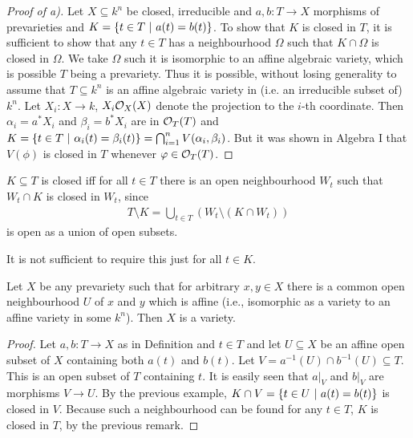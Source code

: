 \documentclass[a4paper,parskip=full,numbers=enddot]{scrreprt}
\begin{document}
\begin{defi}
\begin{example}
\begin{alphanumerate}
    \end{alphanumerate}
\end{example}
\begin{proof}[Proof of a)]
    Let $X\subseteq k^n$ be closed, irreducible and $a,b: T\to X$ morphisms of prevarieties and $K= \left\{t\in T\ \middle|\  a(t) = b(t)\right\}$. To show that $K$ is closed in $T$, it is sufficient to show that any $t\in T$ has a neighbourhood $\Omega$ such that $K\cap \Omega$ is closed in $\Omega$. We take $\Omega$ such it is isomorphic to an affine algebraic variety, which is possible $T$ being a prevariety. Thus it is possible, without losing generality to assume that $T\subseteq k^n$ is an affine algebraic variety in (i.e.  an irreducible subset of) $k^n$. Let $X_i: X\to k$, $X_i\mathcal{O}_X(X)$ denote the projection to the $i$-th coordinate. Then $\alpha_i = a^\ast X_i$ and $\beta_i = b^\ast X_i$ are in $\mathcal{O}_T(T)$ and $K= \left\{ t\in T\ \middle|\  \alpha_i(t) = \beta_i(t)\right\} = \bigcap_{i=1}^n V(\alpha_i, \beta_i)$. But it was shown in Algebra I that $V(\phi)$ is closed in $T$ whenever $\varphi\in  \mathcal{O}_T(T)$\cite[Proposition 2.2.1]{alg1}.
\end{proof}
\begin{rem*}
    \begin{alphanumerate}
    \item 
        $K\subseteq T$ is closed iff for all $t\in T$ there is an open neighbourhood $W_t$ such that $W_t\cap K$ is closed in $W_t$, since 
        \begin{align*}
            T\setminus K = \bigcup_{t\in T} (W_t\setminus (K\cap W_t))
        \end{align*}
        is open as a union of open subsets.
    \item
        It is not sufficient to require this just for all $t\in K$.
    \end{alphanumerate}
\end{rem*}
\begin{prop}
    Let $X$ be any prevariety such that for arbitrary $x,y\in X$ there is a common open neighbourhood $U$ of $x$ and $y$ which is affine (i.e., isomorphic as a variety to an affine variety in some $k^n$). Then $X$ is a variety.
\end{prop}
\begin{proof}
    Let $a,b: T\to X$ as in Definition  and $t\in T$ and let $U\subseteq X$ be an affine open subset of $X$ containing both $a(t)$ and $b(t)$. Let $V = a^{-1}(U) \cap b^{-1}(U)\subseteq T$. This is an open subset of $T$ containing $t$. It is easily seen that $a|_V$ and $b|_V$ are morphisms $V\to U$. By the previous example, $K\cap V = \left\{t\in U\ \middle|\  a(t) = b(t)\right\}$ is closed in $V$. Because such a neighbourhood can be found for any $t\in T$, $K$ is closed in $T$, by the previous remark.
\end{proof}











    

\end{defi}

\printbibliography
\end{document}
